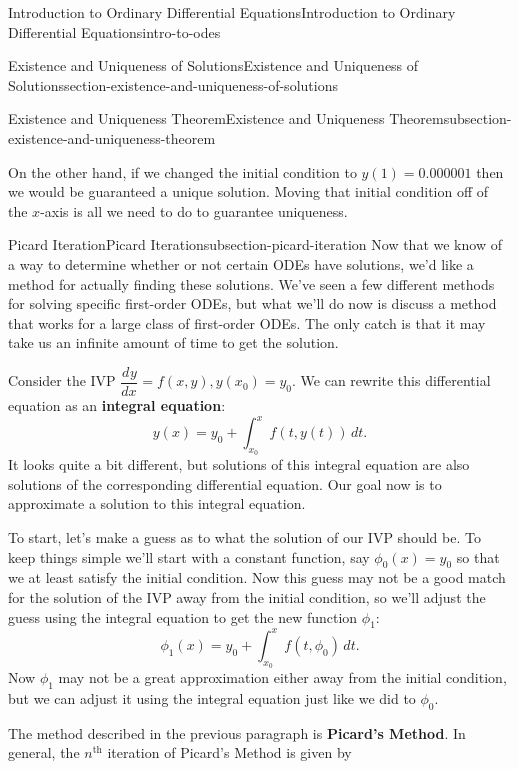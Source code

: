 \documentclass[oneside,10pt,]{book}
\newcommand{\terminology}[1]{\textbf{#1}}
\numberwithin{equation}{section}
\newcommand{\dv}[3][]{\dfrac{d^{#1} #2}{d #3^{#1}}}
\begin{document}
\begin{chapterptx}{Introduction to Ordinary Differential Equations}{}{Introduction to Ordinary Differential Equations}{}{}{intro-to-odes}
\begin{sectionptx}{Existence and Uniqueness of Solutions}{}{Existence and Uniqueness of Solutions}{}{}{section-existence-and-uniqueness-of-solutions}
\begin{subsectionptx}{Existence and Uniqueness Theorem}{}{Existence and Uniqueness Theorem}{}{}{subsection-existence-and-uniqueness-theorem}
\par
\hypertarget{p-99}{}%
On the other hand, if we changed the initial condition to \(y(1) = 0.000001\) then we would be guaranteed a unique solution. Moving that initial condition off of the \(x\)-axis is all we need to do to guarantee uniqueness.%
\end{subsectionptx}
%
%
\typeout{************************************************}
\typeout{************************************************}
%
\begin{subsectionptx}{Picard Iteration}{}{Picard Iteration}{}{}{subsection-picard-iteration}
\hypertarget{p-100}{}%
Now that we know of a way to determine whether or not certain ODEs have solutions, we'd like a method for actually finding these solutions. We've seen a few different methods for solving specific first-order ODEs, but what we'll do now is discuss a method that works for a large class of first-order ODEs. The only catch is that it may take us an infinite amount of time to get the solution.%
\par
\hypertarget{p-101}{}%
Consider the IVP \(\dv{y}{x} = f(x,y), y(x_{0}) = y_{0}\). We can rewrite this differential equation as an \terminology{integral equation}:%
\begin{equation*}
y(x) = y_{0} + \int_{x_{0}}^{x}f(t,y(t))\,dt.
\end{equation*}
It looks quite a bit different, but solutions of this integral equation are also solutions of the corresponding differential equation. Our goal now is to approximate a solution to this integral equation.%
\par
\hypertarget{p-102}{}%
To start, let's make a guess as to what the solution of our IVP should be. To keep things simple we'll start with a constant function, say \(\phi_{0}(x) = y_{0}\) so that we at least satisfy the initial condition. Now this guess may not be a good match for the solution of the IVP away from the initial condition, so we'll adjust the guess using the integral equation to get the new function \(\phi_{1}\):%
\begin{equation*}
\phi_{1}(x) = y_{0} + \int_{x_{0}}^{x}f(t,\phi_{0})\,dt.
\end{equation*}
Now \(\phi_{1}\) may not be a great approximation either away from the initial condition, but we can adjust it using the integral equation just like we did to \(\phi_{0}\).%
\par
\hypertarget{p-103}{}%
The method described in the previous paragraph is \terminology{Picard's Method}. In general, the \(n^{\text{th}}\) iteration of Picard's Method is given by%

\end{subsectionptx}
\end{sectionptx}
\end{chapterptx}
\end{document}
